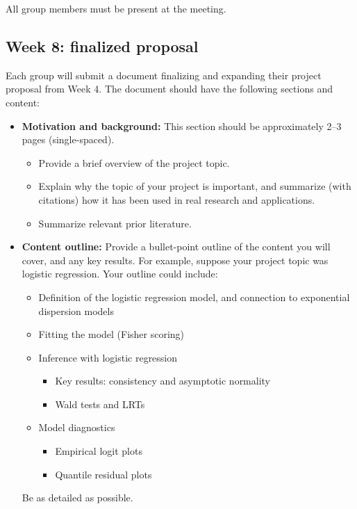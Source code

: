 \documentclass[11pt]{article}
\begin{document}
\noindent All group members must be present at the meeting.

\vspace{0.5cm}

\subsection*{Week 8: finalized proposal}

Each group will submit a document finalizing and expanding their project proposal from Week 4. The document should have the following sections and content:

\begin{itemize}
\item \textbf{Motivation and background:} This section should be approximately 2--3 pages (single-spaced).
\begin{itemize}
\item Provide a brief overview of the project topic.

\item Explain why the topic of your project is important, and summarize (with citations) how it has been used in real research and applications.

\item Summarize relevant prior literature.
\end{itemize}

\item \textbf{Content outline:} Provide a bullet-point outline of the content you will cover, and any key results. For example, suppose your project topic was logistic regression. Your outline could include:
\begin{itemize}
\item Definition of the logistic regression model, and connection to exponential dispersion models
\item Fitting the model (Fisher scoring)
\item Inference with logistic regression
\begin{itemize}
\item Key results: consistency and asymptotic normality
\item Wald tests and LRTs
\end{itemize}
\item Model diagnostics
\begin{itemize}
\item Empirical logit plots
\item Quantile residual plots
\end{itemize}
\end{itemize}
Be as detailed as possible.


\end{itemize}
\end{document}
